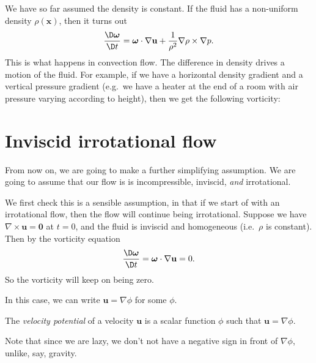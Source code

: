 \documentclass[a4paper]{article}
\begin{document}
We have so far assumed the density is constant. If the fluid has a non-uniform density $\rho(\mathbf{x})$, then it turns out
\[
  \frac{\D \boldsymbol\omega}{\D t} = \boldsymbol\omega \cdot \nabla \mathbf{u} + \frac{1}{\rho^2} \nabla \rho \times \nabla p.
\]
This is what happens in convection flow. The difference in density drives a motion of the fluid. For example, if we have a horizontal density gradient and a vertical pressure gradient (e.g.\ we have a heater at the end of a room with air pressure varying according to height), then we get the following vorticity:
\begin{center}
\end{center}

\section{Inviscid irrotational flow}
From now on, we are going to make a further simplifying assumption. We are going to assume that our flow is is incompressible, inviscid, \emph{and} irrotational.

We first check this is a sensible assumption, in that if we start of with an irrotational flow, then the flow will continue being irrotational. Suppose we have $\nabla \times \mathbf{u} = \mathbf{0}$ at $t = 0$, and the fluid is inviscid and homogeneous (i.e.\ $\rho$ is constant). Then by the vorticity equation
\[
  \frac{\D \boldsymbol\omega}{\D t} = \boldsymbol\omega \cdot \nabla \mathbf{u} = 0.
\]
So the vorticity will keep on being zero.

In this case, we can write $\mathbf{u} = \nabla \phi$ for some $\phi$.
\begin{defi}
  The \emph{velocity potential} of a velocity $\mathbf{u}$ is a scalar function $\phi$ such that $\mathbf{u} = \nabla \phi$.
\end{defi}
Note that since we are lazy, we don't not have a negative sign in front of $\nabla \phi$, unlike, say, gravity.
\end{document}
